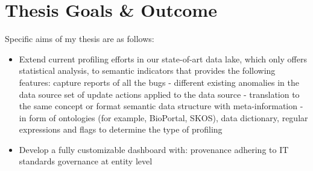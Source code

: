 \section{Thesis Goals \& Outcome}
\label{goals}
Specific aims of my thesis are as follows:
\begin{itemize}
	\item Extend current profiling efforts in our state-of-art data lake, which only offers statistical analysis, to semantic indicators that provides the following features:
	 capture reports of all the bugs - different existing anomalies in the data source
	 set of update actions applied to the data source - translation to the same concept or format
	 semantic data structure with meta-information - in form  of ontologies (for example, BioPortal, SKOS), data dictionary, regular expressions and flags to determine the type of profiling
	\item  Develop a fully customizable dashboard with:
	  provenance adhering to IT standards
	    governance at entity level 

\end{itemize}